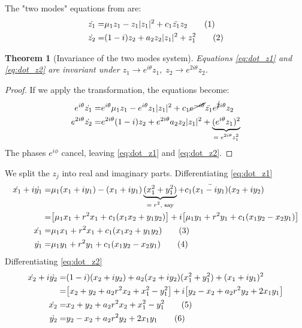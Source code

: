 \documentclass[]{article}
\newcommand\numberthis{\addtocounter{equation}{1}\tag{\theequation}}
\newtheorem{thm}{Theorem}
\begin{document}
The "two modes" equations from \cite[12.4.2]{ChaosBook} are:
\begin{align*}
	\dot{z_1} =& \mu_1 z_1 - z_1 \vert z_1 \vert^2 + c_1 \bar{z_1} z_2  \numberthis \label{eq:dot_z1}\\
	\dot{z_2} =& (1-i)z_2 + a_2z_2 \vert z_1 \vert^2+z_1^2  \numberthis \label{eq:dot_z2}
\end{align*}


\begin{thm}[Invariance of the two modes system]
	Equations \eqref{eq:dot_z1} and \eqref{eq:dot_z2} are invariant under $z_1 \rightarrow e^{i\theta} z_1,\; z_2 \rightarrow e^{2i\theta} z_2$.
\end{thm}
\begin{proof}
	If we apply the transformation, the equations become:
	\begin{align*}
		e^{i\theta} \dot{z_1} =& e^{i\theta} \mu_1 z_1 - e^{i\theta} z_1 \vert z_1 \vert^2 + c_1 \cancel{e^{-i\theta}}   \bar{z_1} e^{\cancel{2}i\theta} z_2 \\
		e^{2i\theta}\dot{z_2} =& e^{2i\theta} (1-i)z_2 + e^{2i\theta} a_2z_2 \vert z_1 \vert^2+\underbrace{(e^{i\theta}z_1)^2}_\text{$= e^{2i\theta}z_1^2$}
	\end{align*}
	The phases $e^{i\phi}$ cancel, leaving \eqref{eq:dot_z1} and \eqref{eq:dot_z2}.
\end{proof}

We split the $z_j$ into real and imaginary parts. Differentiating \eqref{eq:dot_z1}
\begin{align*}
	\dot{x_1} + i\dot{y_1}=& \mu_1(x_1+i y_1) - (x_1+i y_1)  \underbrace{(x_1^2+ y_1^2)}_\text{$= r^2$, say}  + c_1 \bar{(x_1-i y_1)} (x_2+i y_2)\\
	=& \big[\mu_1 x_1 + r^2 x_1 +c_1(x_1x_2+y_1y_2)\big]+ i\big[\mu_1y_1 + r^2 y_1 +c_1(x_1y_2-x_2y_1)\big]\\
	\dot{x_1} =&\mu_1 x_1 + r^2 x_1 +c_1(x_1x_2+y_1y_2)  \numberthis \label{eq:dot_x1}\\
	\dot{y_1}=& \mu_1y_1 + r^2 y_1 +c_1(x_1y_2-x_2y_1)  \numberthis \label{eq:dot_y1}
\end{align*}
Differentiating \eqref{eq:dot_z2}
\begin{align*}
	\dot{x_2} + i\dot{y_2} =& (1-i)(x_2+i y_2) + a_2(x_2+i y_2) (x_1^2+ y_1^2)+(x_1+i y_1)^2\\
	=& \big[x_2+y_2 + a_2 r^2 x_2 +x_1^2-y_1^2\big] + i\big[y_2-x_2+a_2 r^2 y_2 + 2 x_1y_1\big]\\
	\dot{x_2} =&x_2+y_2 + a_2 r^2 x_2 +x_1^2-y_1^2 \numberthis \label{eq:dot_x2}\\
	\dot{y_2}=& y_2-x_2+a_2 r^2 y_2 + 2 x_1y_1  \numberthis \label{eq:dot_y2}
\end{align*}
\end{document}
